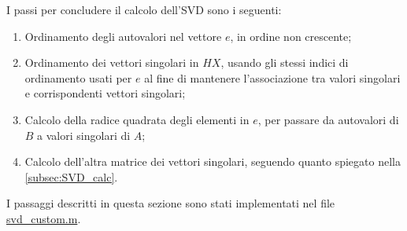 I passi per concludere il calcolo dell'SVD sono i seguenti:
\begin{enumerate}
	\item Ordinamento degli autovalori nel vettore $e$, in ordine non crescente;
	\item Ordinamento dei vettori singolari in $HX$, usando gli stessi indici di 
ordinamento usati per $e$ al fine di mantenere l'associazione tra valori 
singolari e corrispondenti vettori singolari;
	\item Calcolo della radice quadrata degli elementi in $e$, per passare da 
autovalori di $B$ a valori singolari di $A$;
	\item Calcolo dell'altra matrice dei vettori singolari, seguendo quanto 
spiegato nella \autoref{subsec:SVD_calc}.
\end{enumerate}

\noindent
I passaggi descritti in questa sezione sono stati implementati nel file 
\href{https://github.com/Yagotzirck/svd_benchmark/blob/main/src/svd_custom.m}{svd\_custom.m}.